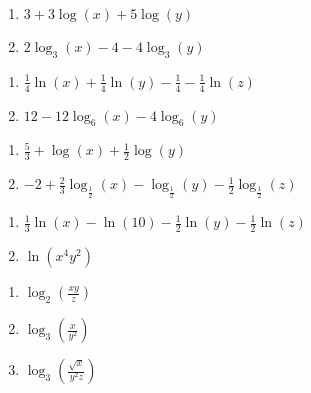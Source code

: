 \documentclass{ximera}
\begin{document}
\begin{multicols}{2}
\begin{enumerate}
\setcounter{enumi}{\value{HW}}

\item $3 + 3\log(x) + 5 \log(y)$
\item $2\log_{3}(x) - 4 - 4\log_{3}(y)$

\setcounter{HW}{\value{enumi}}
\end{enumerate}
\end{multicols}

\begin{multicols}{2}
\begin{enumerate}
\setcounter{enumi}{\value{HW}}

\item $\frac{1}{4} \ln(x) + \frac{1}{4} \ln(y) - \frac{1}{4} - \frac{1}{4} \ln(z)$
\item $12-12\log_{6}(x) - 4\log_{6}(y)$

\setcounter{HW}{\value{enumi}}
\end{enumerate}
\end{multicols}

\begin{multicols}{2}
\begin{enumerate}
\setcounter{enumi}{\value{HW}}

\item $\frac{5}{3}+\log(x)+\frac{1}{2}\log(y)$
\item $-2+\frac{2}{3}\log_{\frac{1}{2}}(x)-\log_{\frac{1}{2}}(y)-\frac{1}{2}\log_{\frac{1}{2}}(z)$

\setcounter{HW}{\value{enumi}}
\end{enumerate}
\end{multicols}

\begin{multicols}{2}
\begin{enumerate}
\setcounter{enumi}{\value{HW}}

\item $\frac{1}{3} \ln(x) - \ln(10) - \frac{1}{2}\ln(y)-\frac{1}{2}\ln(z)$
\item $\ln(x^{4}y^{2})$
\setcounter{HW}{\value{enumi}}
\end{enumerate}
\end{multicols}

\begin{multicols}{3}
\begin{enumerate}
\setcounter{enumi}{\value{HW}}

\item $\log_{2}\left(\frac{xy}{z}\right)$
\item $\log_{3} \left( \frac{x}{y^2} \right)$
\item $\log_{3}\left(\frac{\sqrt{x}}{y^{2}z}\right)$

\setcounter{HW}{\value{enumi}}
\end{enumerate}
\end{multicols}
\end{document}
